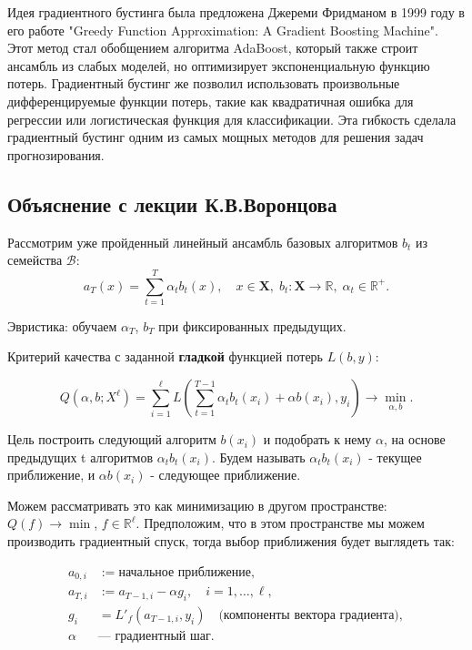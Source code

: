 Идея градиентного бустинга была предложена Джереми Фридманом в 1999 году в его работе "Greedy Function Approximation: A Gradient Boosting Machine". Этот метод стал обобщением алгоритма AdaBoost, который также строит ансамбль из слабых моделей, но оптимизирует экспоненциальную функцию потерь. Градиентный бустинг же позволил использовать произвольные дифференцируемые функции потерь, такие как квадратичная ошибка для регрессии или логистическая функция для классификации. Эта гибкость сделала градиентный бустинг одним из самых мощных методов для решения задач прогнозирования.

\subsection{Объяснение с лекции К.В.Воронцова}

Рассмотрим уже пройденный линейный ансамбль базовых алгоритмов $b_t$ из семейства $\mathcal{B}$:
\[
    a_T(x) = \sum_{t=1}^{T} \alpha_t b_t(x), \quad x \in \textbf{X}, \; b_t : \textbf{X} \to \mathbb{R}, \; \alpha_t \in \mathbb{R}^+.
\]

Эвристика: обучаем $\alpha_T$, $b_T$ при фиксированных предыдущих.

Критерий качества с заданной \textbf{гладкой} функцией потерь $L(b, y)$:

\[
    Q(\alpha, b; X^\ell) = \sum_{i=1}^\ell L\left(\sum_{t=1}^{T-1} \alpha_t b_t(x_i) + \alpha b(x_i), y_i \right) \to \min_{\alpha, b}.
\]

Цель построить следующий алгоритм $b(x_i)$ и подобрать к нему $\alpha$, на основе предыдущих t алгоритмов $\alpha_t b_t(x_i)$.
Будем называть $\alpha_t b_t(x_i)$ - текущее приближение, и $\alpha b(x_i)$ - следующее приближение.

Можем рассматривать это как минимизацию в другом пространстве: $Q(f) \to \min$, $f \in \mathbb{R}^\ell$. Предположим, что в этом пространстве мы можем производить градиентный спуск, тогда выбор приближения будет выглядеть так:

\begin{align*}
    a_{0,i} & := \text{начальное приближение},                                    \\
    a_{T,i} & := a_{T-1,i} - \alpha g_i, \quad i = 1, \dots, \ell,                \\
    g_i     & = L'_f(a_{T-1,i}, y_i) \quad \text{(компоненты вектора градиента)}, \\
    \alpha  & \text{--- градиентный шаг}.
\end{align*}

